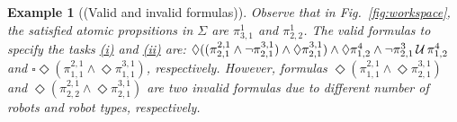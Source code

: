 \documentclass[Afour,sageh,times]{sagej}
\newtheorem{exmp}{Example}
\renewcommand{\ap}[3]{\mathcal{\pi}_{{#1},{#2}}^{#3}}
\newenvironment{cexmp}
{\addtocounter{exmp}{-1}\begin{exmp}}
  {\end{exmp}}
\begin{document}
 \begin{cexmp} [(Valid and invalid formulas)]
Observe that in Fig.~\ref{fig:workspace}, the satisfied atomic propsitions in $\Sigma$ are $\ap{3}{1}{1}$ and $\ap{2}{2}{1}$.   The valid formulas to specify the tasks \hyperref[task:i]{\it (i)} and \hyperref[task:ii]{\it (ii)} are: $\Diamond \Large((\ap{2}{1}{2,1}\wedge \neg \ap{2}{1}{3,1}) \wedge  \Diamond \ap{2}{1}{3,1}\Large)  \wedge \Diamond \ap{1}{2}{4} \wedge \neg \ap{2}{1}{3} \,\mathcal{U}\, \ap{1}{2}{4}$ and $\square \Diamond (\ap{1}{1}{2,1} \wedge \Diamond \ap{1}{1}{3,1})$, respectively. However, formulas $\Diamond (\ap{1}{1}{2,1} \wedge \Diamond \ap{2}{1}{3,1})$ and $\Diamond (\ap{2}{2}{2,1} \wedge \Diamond \ap{2}{1}{3,1})$ are two invalid formulas due to different number of robots and robot types, respectively.
 \end{cexmp}
\end{document}

